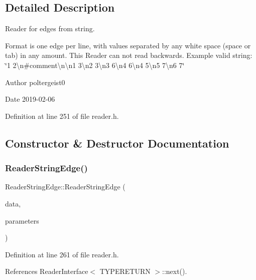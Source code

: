 \subsection{Detailed Description}
Reader for edges from string. 

Format is one edge per line, with values separated by any white space (space or tab) in any amount. This Reader can not read backwards. Example valid string\+: \char`\"{}1 2\textbackslash{}n\#comment\textbackslash{}n\textbackslash{}n1 3\textbackslash{}n2 3\textbackslash{}n3 6\textbackslash{}n4 6\textbackslash{}n4 5\textbackslash{}n5 7\textbackslash{}n6 7\char`\"{}

\begin{DoxyAuthor}{Author}
poltergeist0
\end{DoxyAuthor}
\begin{DoxyDate}{Date}
2019-\/02-\/06 
\end{DoxyDate}


Definition at line 251 of file reader.\+h.



\subsection{Constructor \& Destructor Documentation}
\mbox{\label{classReaderStringEdge_acfd14224a4533371c4c2314d1434e65c}} 
\subsubsection{\texorpdfstring{Reader\+String\+Edge()}{ReaderStringEdge()}}
{\footnotesize\ttfamily Reader\+String\+Edge\+::\+Reader\+String\+Edge (\begin{DoxyParamCaption}\item[{std\+::string}]{data,  }\item[{const \hyperlink{structProgramParameters}{Program\+Parameters} \&}]{parameters }\end{DoxyParamCaption})\hspace{0.3cm}{\ttfamily [inline]}}



Definition at line 261 of file reader.\+h.



References Reader\+Interface$<$ T\+Y\+P\+E\+R\+E\+T\+U\+R\+N $>$\+::next().

